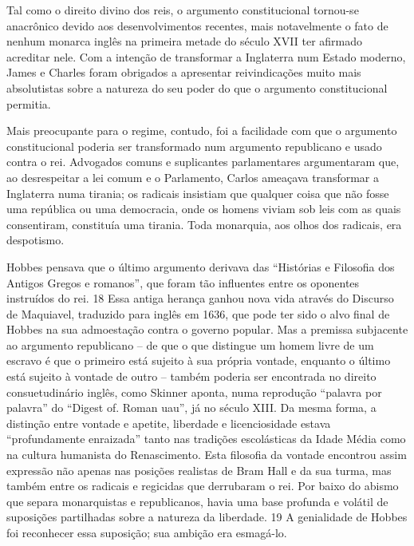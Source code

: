 \par
 
Tal como o direito divino dos reis, o argumento constitucional tornou-se anacrônico devido aos desenvolvimentos recentes, mais notavelmente o fato de nenhum monarca inglês na primeira metade do século XVII ter afirmado acreditar nele. Com a intenção de transformar a Inglaterra num Estado moderno, James e Charles foram obrigados a apresentar reivindicações muito mais absolutistas sobre a natureza do seu poder do que o argumento constitucional permitia.
 
\par
 
Mais preocupante para o regime, contudo, foi a facilidade com que o argumento constitucional poderia ser transformado num argumento republicano e usado contra o rei. Advogados comuns e suplicantes parlamentares argumentaram que, ao desrespeitar a lei comum e o Parlamento, Carlos ameaçava transformar a Inglaterra numa tirania; os radicais insistiam que qualquer coisa que não fosse uma república ou uma democracia, onde os homens viviam sob leis com as quais consentiram, constituía uma tirania. Toda monarquia, aos olhos dos radicais, era despotismo.
 
\par
 
Hobbes pensava que o último argumento derivava das “Histórias e Filosofia dos Antigos Gregos e romanos”, que foram tão influentes entre os oponentes instruídos do rei.
 {\color{blue} 18}  
Essa antiga herança ganhou nova vida através do Discurso de Maquiavel, traduzido para inglês em 1636, que pode ter sido o alvo final de Hobbes na sua admoestação contra o governo popular. Mas a premissa subjacente ao argumento republicano – de que o que distingue um homem livre de um escravo é que o primeiro está sujeito à sua própria vontade, enquanto o último está sujeito à vontade de outro – também poderia ser encontrada no direito consuetudinário inglês, como Skinner aponta, numa reprodução “palavra por palavra” do “Digest of. Roman uau”, já no século XIII. Da mesma forma, a distinção entre vontade e apetite, liberdade e licenciosidade estava “profundamente enraizada” tanto nas tradições escolásticas da Idade Média como na cultura humanista do Renascimento. Esta filosofia da vontade encontrou assim expressão não apenas nas posições realistas de Bram Hall e da sua turma, mas também entre os radicais e regicidas que derrubaram o rei. Por baixo do abismo que separa monarquistas e republicanos, havia uma base profunda e volátil de suposições partilhadas sobre a natureza da liberdade.
 {\color{blue} 19}  
A genialidade de Hobbes foi reconhecer essa suposição; sua ambição era esmagá-lo.
 

